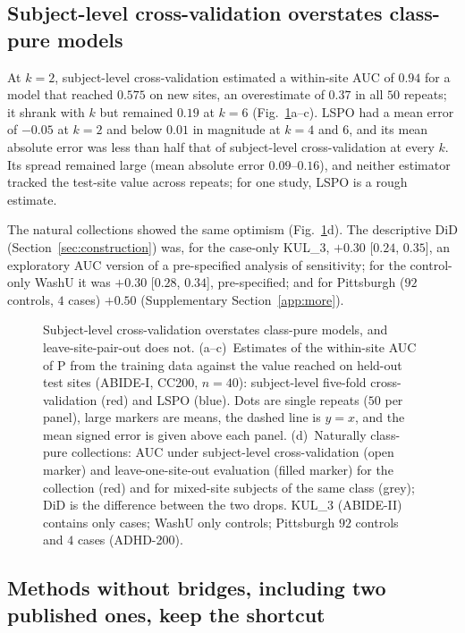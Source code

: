 \subsection{Subject-level cross-validation overstates class-pure models}\label{sec:res-eval}

At $k=2$, subject-level cross-validation estimated a within-site AUC of $0.94$ for a model that reached $0.575$ on new sites, an overestimate of $0.37$ in all $50$ repeats; it shrank with $k$ but remained $0.19$ at $k=6$ (Fig.~\ref{fig:evaluation}a--c). LSPO had a mean error of $-0.05$ at $k=2$ and below $0.01$ in magnitude at $k=4$ and $6$, and its mean absolute error was less than half that of subject-level cross-validation at every $k$. Its spread remained large (mean absolute error $0.09$--$0.16$), and neither estimator tracked the test-site value across repeats; for one study, LSPO is a rough estimate.

The natural collections showed the same optimism (Fig.~\ref{fig:evaluation}d). The descriptive DiD (Section~\ref{sec:construction}) was, for the case-only KUL\_3, $+0.30$ [$0.24$, $0.35$], an exploratory AUC version of a pre-specified analysis of sensitivity; for the control-only WashU it was $+0.30$ [$0.28$, $0.34$], pre-specified; and for Pittsburgh ($92$ controls, $4$ cases) $+0.50$ (Supplementary Section~\ref{app:more}).

\begin{figure}[tbp]
\centering
{}
\caption{Subject-level cross-validation overstates class-pure models, and leave-site-pair-out does not. (a--c)~Estimates of the within-site AUC of P from the training data against the value reached on held-out test sites (ABIDE-I, CC200, $n=40$): subject-level five-fold cross-validation (red) and LSPO (blue). Dots are single repeats ($50$ per panel), large markers are means, the dashed line is $y=x$, and the mean signed error is given above each panel. (d)~Naturally class-pure collections: AUC under subject-level cross-validation (open marker) and leave-one-site-out evaluation (filled marker) for the collection (red) and for mixed-site subjects of the same class (grey); DiD is the difference between the two drops. KUL\_3 (ABIDE-II) contains only cases; WashU only controls; Pittsburgh $92$ controls and $4$ cases (ADHD-200).}
\label{fig:evaluation}
\end{figure}

\subsection{Methods without bridges, including two published ones, keep the shortcut}\label{sec:res-pureonly}


